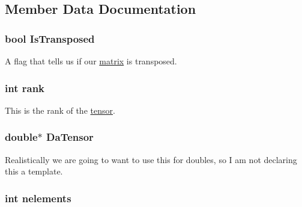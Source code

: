 \subsection{Member Data Documentation}
\hypertarget{classJKBuilder_1_1matrix_a77fa48e57c519482de2ec7ec182b16ef}{
\subsubsection[{IsTransposed}]{\setlength{\rightskip}{0pt plus 5cm}bool {\bf IsTransposed}}}
\label{classJKBuilder_1_1matrix_a77fa48e57c519482de2ec7ec182b16ef}


A flag that tells us if our \hyperlink{classJKBuilder_1_1matrix}{matrix} is transposed. \hypertarget{classJKBuilder_1_1tensor_a6cfd95afd0afebd625b889fb6e58371c}{
\subsubsection[{rank}]{\setlength{\rightskip}{0pt plus 5cm}int {\bf rank}}}
\label{classJKBuilder_1_1tensor_a6cfd95afd0afebd625b889fb6e58371c}


This is the rank of the \hyperlink{classJKBuilder_1_1tensor}{tensor}. \hypertarget{classJKBuilder_1_1tensor_a91f7b1e58c0e5d1a49ddb8b80ab7790e}{
\subsubsection[{DaTensor}]{\setlength{\rightskip}{0pt plus 5cm}double$\ast$ {\bf DaTensor}}}
\label{classJKBuilder_1_1tensor_a91f7b1e58c0e5d1a49ddb8b80ab7790e}


Realistically we are going to want to use this for doubles, so I am not declaring this a template. \hypertarget{classJKBuilder_1_1tensor_a23ae6a00bed19d2ad34d439636e797da}{
\subsubsection[{nelements}]{\setlength{\rightskip}{0pt plus 5cm}int {\bf nelements}}}
\label{classJKBuilder_1_1tensor_a23ae6a00bed19d2ad34d439636e797da}


